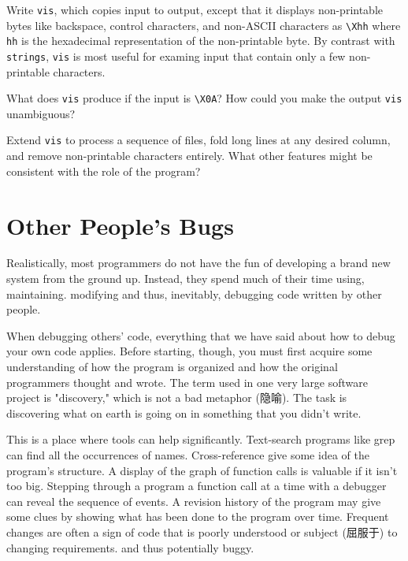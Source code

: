 \begin{exercise}
    Write \verb'vis', which copies input to output, except that it displays
    non-printable bytes like backspace, control characters, and non-ASCII
    characters as \verb'\Xhh' where \verb'hh' is the hexadecimal
    representation of the non-printable byte. By contrast with
    \verb'strings', \verb'vis' is most useful for examing input that
    contain only a few non-printable characters.
\end{exercise}

\begin{exercise}
    What does \verb'vis' produce if the input is \verb'\X0A'? How could you
    make the output \verb'vis' unambiguous?
\end{exercise}

\begin{exercise}
    Extend \verb'vis' to process a sequence of files, fold long lines at
    any desired column, and remove non-printable characters entirely.
    What other features might be consistent with the role of the program?
\end{exercise}

\section{Other People's Bugs}

Realistically, most programmers do not have the fun of developing a brand
new system from the ground up. Instead, they spend much of their time
using, maintaining. modifying and thus, inevitably, debugging code written
by other people.

When debugging others' code, everything that we have said about how to
debug your own code applies. Before starting, though, you must first
acquire some understanding of how the program is organized and how the
original programmers thought and wrote. The term used in one very large
software project is "discovery," which is not a bad metaphor (隐喻). The
task is discovering what on earth is going on in something that you didn't
write.

This is a place where tools can help significantly. Text-search programs
like grep can find all the occurrences of names. Cross-reference give
some idea of the program's structure. A display of the graph of function
calls is valuable if it isn't too big. Stepping through a program a
function call at a time with a debugger can reveal the sequence of events.
A revision history of the program may give some clues by showing what has
been done to the program over time. Frequent changes are often a sign of
code that is poorly understood or subject (屈服于) to changing
requirements.  and thus potentially buggy.

